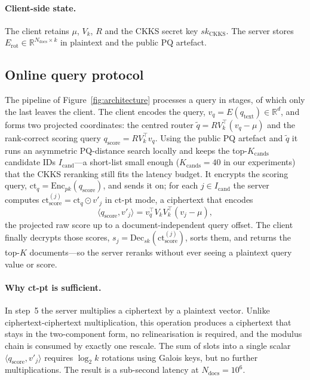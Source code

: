 \paragraph{Client-side state.} The client retains $\mu$, $V_k$, $R$ and
the CKKS secret key $sk_{\mathrm{CKKS}}$. The server stores
$E_{\mathrm{rot}} \in \mathbb{R}^{N_{\mathrm{docs}} \times k}$ in plaintext
and the public PQ artefact.

\subsection{Online query protocol}\label{ssec:online}

The pipeline of Figure~\ref{fig:architecture} processes a query in stages, of
which only the last leaves the client. The client encodes the query,
$v_q = E(q_{\mathrm{text}}) \in \mathbb{R}^d$, and forms two projected
coordinates: the centred router
$\widetilde q=R V_k^\top(v_q-\mu)$ and the rank-correct scoring query
$q_{\mathrm{score}}=R V_k^\top v_q$. Using the public PQ artefact and
$\widetilde q$ it runs an asymmetric PQ-distance search locally and
keeps the top-$K_{\mathrm{cands}}$ candidate IDs $I_{\mathrm{cand}}$---a
short-list small enough ($K_{\mathrm{cands}} = 40$ in our experiments) that the
CKKS reranking still fits the latency budget. It encrypts the scoring query,
$\mathrm{ct}_q = \mathrm{Enc}_{pk}(q_{\mathrm{score}})$, and sends it on; for each
$j \in I_{\mathrm{cand}}$ the server computes
$\mathrm{ct}_{\mathrm{score}}^{(j)} = \mathrm{ct}_q \odot v'_j$ in ct-pt mode,
a ciphertext that encodes
\[
\langle q_{\mathrm{score}},v'_j\rangle
=v_q^\top V_kV_k^\top(v_j-\mu),
\]
the projected raw score up to a document-independent query offset. The client finally decrypts those scores,
$s_j = \mathrm{Dec}_{sk}(\mathrm{ct}_{\mathrm{score}}^{(j)})$, sorts them, and
returns the top-$K$ documents---so the server reranks without ever seeing a
plaintext query value or score.

\paragraph{Why ct-pt is sufficient.} In step~5 the server multiplies a
ciphertext by a plaintext vector. Unlike ciphertext-ciphertext
multiplication, this operation produces a ciphertext that stays in the
two-component form, no relinearisation is required, and the modulus chain
is consumed by exactly one rescale. The sum of slots into a single
scalar $\langle q_{\mathrm{score}}, v'_j \rangle$ requires $\log_2 k$ rotations using
Galois keys, but no further multiplications. The result is a sub-second
latency at $N_{\mathrm{docs}} = 10^6$.

